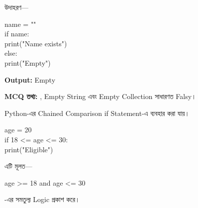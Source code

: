 উদাহরণ—

\begin{codebox}
\begin{english}
\ttfamily
name = ""\\
if name:\\
\hspace*{4mm}print("Name exists")\\
else:\\
\hspace*{4mm}print("Empty")
\end{english}
\end{codebox}

\textbf{Output:}
\textenglish{\ttfamily Empty}

\begin{rememberbox}

\textbf{\color{deepOrange}MCQ তথ্য:}
\quad
\textenglish{},
Empty String এবং Empty Collection সাধারণত Falsy।

\end{rememberbox}



Python-এর Chained Comparison
\textenglish{\ttfamily if}
Statement-এ ব্যবহার করা যায়।

\begin{codebox}
\begin{english}
\ttfamily
age = 20\\
if 18 <= age <= 30:\\
\hspace*{4mm}print("Eligible")
\end{english}
\end{codebox}

এটি মূলত—

\begin{center}

\textenglish{\ttfamily age >= 18 and age <= 30}

\end{center}

-এর সমতুল্য Logic প্রকাশ করে।



